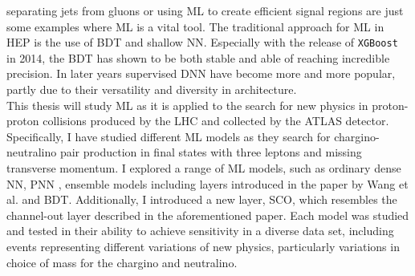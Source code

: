 separating jets from gluons \cite{PhysRevD.44.2025} or using \ac{ML} to create efficient signal regions \cite{baldi_searching_2014} are 
just some examples where \ac{ML} is a vital tool. The traditional approach for \ac{ML} in \ac{HEP} is the use of \ac{BDT} and shallow \ac{NN}. 
Especially with the release of \verb!XGBoost! \cite{XGB} in 2014, the \ac{BDT} has shown to be both stable and able of reaching incredible 
precision. In later years supervised \ac{DNN} have become more and more popular, partly due to their versatility and diversity in architecture.
\newline
\\
This thesis will study \ac{ML} as it is applied to the search for new physics in proton-proton collisions produced by the \ac{LHC} and collected by 
the \acs{ATLAS} detector. Specifically, I have studied different \ac{ML} models as they search for chargino-neutralino pair production in final states 
with three leptons and missing transverse momentum. I explored a range of \ac{ML} models, such as ordinary dense \acl{NN}, \acl{PNN} \cite{PNN},
ensemble models including layers introduced in the paper by Wang et al. \cite{wang_maxout_2013} and \acl{BDT}. Additionally, I introduced a new layer, \acl{SCO}, which 
resembles the channel-out layer described in the aforementioned paper. Each model was studied and tested in their ability to achieve sensitivity in a diverse 
data set, including events representing different variations of new physics, particularly variations in choice of mass for the chargino and neutralino.
\newpage
